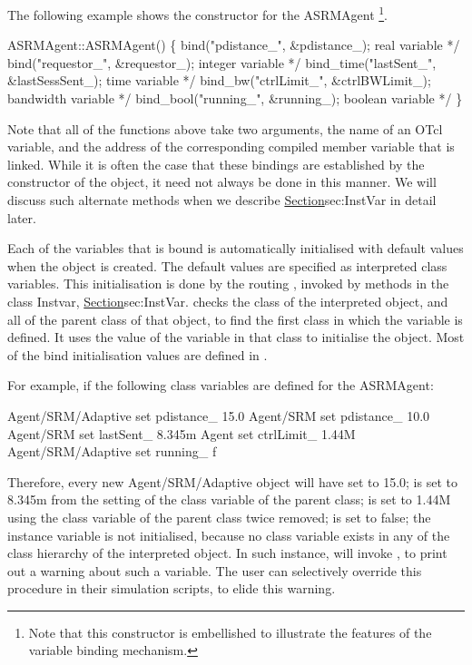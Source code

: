 The following example shows the constructor for the ASRMAgent%
\footnote{Note that this constructor is embellished to illustrate
        the features of the variable binding mechanism.}.
\begin{program}
        ASRMAgent::ASRMAgent() \{
                bind("pdistance_", &pdistance_);      \* real variable */
                bind("requestor_", &requestor_);      \* integer variable */
                bind_time("lastSent_", &lastSessSent_); \* time variable */
                bind_bw("ctrlLimit_", &ctrlBWLimit_); \* bandwidth variable */
                bind_bool("running_", &running_);     \* boolean variable */
        \}
\end{program}
Note that all of the functions above take two arguments,
the name of an OTcl variable,
and the address of the corresponding compiled member variable
that is linked.
While it is often the case that these bindings are established
by the constructor of the object, 
it need not always be done in this manner.
We will discuss such alternate methods
when we describe \href{the class InstVar}{Section}{sec:InstVar}
in detail later.

Each of the variables that is bound is automatically initialised
with default values when the object is created.
The default values are specified as interpreted class variables.
This initialisation is done by the routing ,
invoked by methods in the class Instvar,
\href{described later}{Section}{sec:InstVar}.
 checks the class of the interpreted object,
and all of the parent class of that object, to find the first
class in which the variable is defined.
It uses the value of the variable in that class to initialise the object.
Most of the bind initialisation values are defined in
.

For example, if the following class variables are defined for the ASRMAgent:
\begin{program}
        Agent/SRM/Adaptive set pdistance_ 15.0
        Agent/SRM set pdistance_ 10.0
        Agent/SRM set lastSent_ 8.345m
        Agent set ctrlLimit_    1.44M
        Agent/SRM/Adaptive set running_ f
\end{program}
Therefore, every new Agent/SRM/Adaptive object will have
 set to 15.0;
 is set to 8.345m
from the setting of the class variable of the parent class;
 is set to 1.44M
using the class variable of the parent class twice removed;
 is set to false;
the instance variable  is not initialised,
because no class variable
exists in any of the class hierarchy of the interpreted object.
In such instance,  will invoke 
, to print out a warning about such a variable.
The user can selectively override this procedure
in their simulation scripts, to elide this warning.

